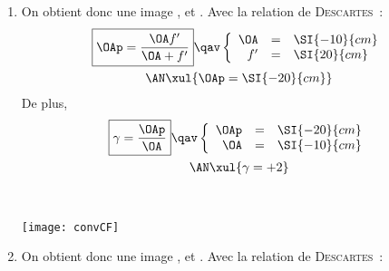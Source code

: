 \documentclass[a4paper, 10pt, garamond, oneside]{book}
\begin{document}
{\begin{enumerate}
\begin{minipage}[t]{.48\linewidth}
\begin{center}
				      \texttt{[image: convAF]}
			      \end{center}
		      \end{minipage}
		\item
		      \noindent
		      \begin{minipage}[t]{.48\linewidth}
			      On obtient donc une image ,  et
			      . Avec la relation de \textsc{Descartes}~:
			      \begin{gather*}
				      \boxed{\OAp = \frac{\OA f'}{\OA+f'}}
				      \qav
				      \left\{
				      \begin{array}{rcl}
					      \OA & = & \SI{-10}{cm}
					      \\
					      f'  & = & \SI{20}{cm}
				      \end{array}
				      \right.\\
				      \AN
				      \xul{
					      \OAp = \SI{-20}{cm}
				      }
			      \end{gather*}
			      De plus,
			      \begin{gather*}
				      \boxed{\gamma = \frac{\OAp}{\OA}}
				      \qav
				      \left\{
				      \begin{array}{rcl}
					      \OAp & = & \SI{-20}{cm}
					      \\
					      \OA  & = & \SI{-10}{cm}
				      \end{array}
				      \right.\\
				      \AN
				      \xul{
					      \gamma = +2
				      }
			      \end{gather*}
		      \end{minipage}
		      \hfill
		      \begin{minipage}[t]{.48\linewidth}
			      ~
			      \begin{center}
				      \texttt{[image: convCF]}
			      \end{center}
		      \end{minipage}
		\item
		      \noindent
		      \begin{minipage}[t]{.48\linewidth}

			      On obtient donc une image ,  et
			      . Avec la relation de \textsc{Descartes}~:


\end{minipage}
\end{enumerate}}
\end{document}
